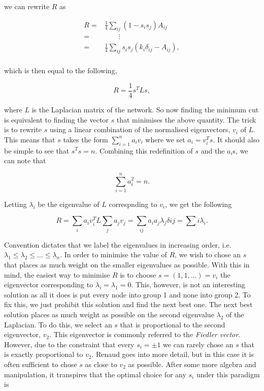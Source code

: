 we can rewrite $R$ as

$$
\begin{aligned}
    R =& \frac{1}{4}\sum_{ij}(1 - s_i s_j)A_{ij} \\
      =& \qquad \vdots \\
      =& \frac{1}{4}\sum_{ij}s_i s_j(k_i\delta_{ij} - A_{ij}), \\
\end{aligned}
$$

which is then equal to the following,

$$ R = \frac{1}{4}s^TLs, $$

where $L$ is the Laplacian matrix of the network. So now finding the minimum cut is equivalent to finding the vector $s$ that minimises the above quantity. The trick is to rewrite $s$ using a linear combination of the normalised eigenvectors, $v_i$ of $L$. This means that $s$ takes the form $\sum_{i=1}^n a_iv_i$ where we set $a_i = v_i^T s$. It should also be simple to see that $s^Ts = n$. Combining this redefinition of $s$ and the $a_i$s, we can note that

$$ \sum_{i=1}^n a_i^2 = n. $$

Letting $\lambda_i$ be the eigenvalue of $L$ correspnding to $v_i$, we get the following

$$ R = \sum_i a_iv_i^TL\sum_ja_jv_j = \sum_{ij}a_ia_j\lambda_j\delta{ij} = \sum{i}\lambda_i. $$

Convention dictates that we label the eigenvalues in increasing order, i.e. $\lambda_1 \leq \lambda_2 \leq \dots \leq \lambda_n$. In order to minimise the value of $R$, we wish to chose an $s$ that places as much weight on the smaller eigenvalues as possible. With this in mind, the easiest way to minimise $R$ is to choose $s = (1, 1, \dots) = v_i$ the eigenvector corresponding to $\lambda_i = \lambda_1 = 0$. This, however, is not an interesting solution as all it does is put every node into group 1 and none into group 2. To fix this, we just prohibit this solution and find the next best one. The next best solution places as much weight as possible on the second eigenvalue $\lambda_2$ of the Laplacian. To do this, we select an $s$ that is proportional to the second eigenvector, $v_2$. This eigenvector is commonly referred to the \emph{Fiedler vector}. However, due to the constraint that every $s_i = \pm 1$ we can rarely chose an $s$ that is exactly proportional to $v_2$. Renaud goes into more detail, but in this case it is often sufficient to chose $s$ as close to $v_2$ as possible. After some more algebra and manipulation, it transpires that the optimal choice for any $s_i$ under this paradigm is 

